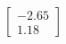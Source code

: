 \documentclass[preview]{standalone}
\begin{document}
\begin{align*}
\begin{bmatrix} -2.65 \\ 1.18 \end{bmatrix}
\end{align*}
\end{document}
